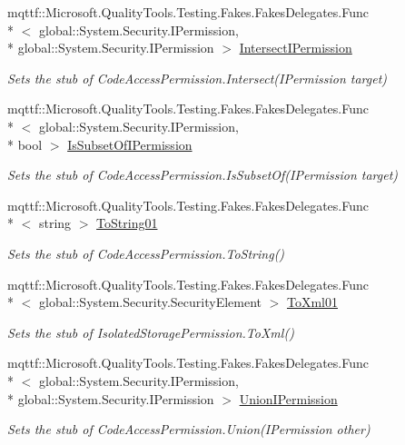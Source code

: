 \begin{DoxyCompactItemize}
mqttf\-::\-Microsoft.\-Quality\-Tools.\-Testing.\-Fakes.\-Fakes\-Delegates.\-Func\\*
$<$ global\-::\-System.\-Security.\-I\-Permission, \\*
global\-::\-System.\-Security.\-I\-Permission $>$ \hyperlink{class_system_1_1_security_1_1_permissions_1_1_fakes_1_1_stub_isolated_storage_permission_a2d61c76240be9920724f92a256a30592}{Intersect\-I\-Permission}
\begin{DoxyCompactList}\small\item\em Sets the stub of Code\-Access\-Permission.\-Intersect(\-I\-Permission target)\end{DoxyCompactList}\item 
mqttf\-::\-Microsoft.\-Quality\-Tools.\-Testing.\-Fakes.\-Fakes\-Delegates.\-Func\\*
$<$ global\-::\-System.\-Security.\-I\-Permission, \\*
bool $>$ \hyperlink{class_system_1_1_security_1_1_permissions_1_1_fakes_1_1_stub_isolated_storage_permission_a1bf5c6126563585f43c49fd7ae0e5b4e}{Is\-Subset\-Of\-I\-Permission}
\begin{DoxyCompactList}\small\item\em Sets the stub of Code\-Access\-Permission.\-Is\-Subset\-Of(\-I\-Permission target)\end{DoxyCompactList}\item 
mqttf\-::\-Microsoft.\-Quality\-Tools.\-Testing.\-Fakes.\-Fakes\-Delegates.\-Func\\*
$<$ string $>$ \hyperlink{class_system_1_1_security_1_1_permissions_1_1_fakes_1_1_stub_isolated_storage_permission_a443c4a342dd9233a0ec67bd9e9fa6616}{To\-String01}
\begin{DoxyCompactList}\small\item\em Sets the stub of Code\-Access\-Permission.\-To\-String()\end{DoxyCompactList}\item 
mqttf\-::\-Microsoft.\-Quality\-Tools.\-Testing.\-Fakes.\-Fakes\-Delegates.\-Func\\*
$<$ global\-::\-System.\-Security.\-Security\-Element $>$ \hyperlink{class_system_1_1_security_1_1_permissions_1_1_fakes_1_1_stub_isolated_storage_permission_a15057c20396f57d58dff68dddb16932b}{To\-Xml01}
\begin{DoxyCompactList}\small\item\em Sets the stub of Isolated\-Storage\-Permission.\-To\-Xml()\end{DoxyCompactList}\item 
mqttf\-::\-Microsoft.\-Quality\-Tools.\-Testing.\-Fakes.\-Fakes\-Delegates.\-Func\\*
$<$ global\-::\-System.\-Security.\-I\-Permission, \\*
global\-::\-System.\-Security.\-I\-Permission $>$ \hyperlink{class_system_1_1_security_1_1_permissions_1_1_fakes_1_1_stub_isolated_storage_permission_a3db65a9f6557917e2ce85149bd47f9aa}{Union\-I\-Permission}
\begin{DoxyCompactList}\small\item\em Sets the stub of Code\-Access\-Permission.\-Union(\-I\-Permission other)\end{DoxyCompactList}\end{DoxyCompactItemize}
